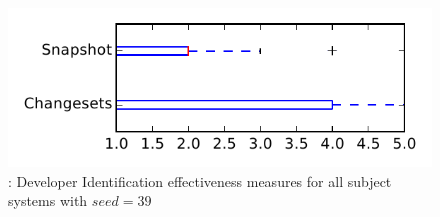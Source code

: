 
\begin{figure}
\centering
\includegraphics[height=0.4\textheight]{figures/dit_seed/rq1_tiny_39}
\caption{\rtwo: Developer Identification effectiveness measures for all subject systems with $seed=39$}
\label{fig:dit_seed:rq1:tiny}
\end{figure}
